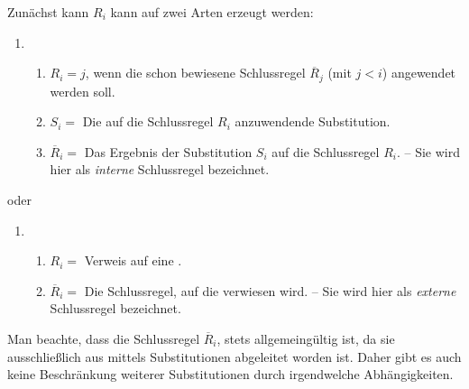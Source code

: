\begin{enumerate}
	Zunächst kann $R_i$ kann auf zwei Arten erzeugt werden:
	\begin{enumerate}
		\item
		\begin{enumerate}
			\item $R_i = j$, wenn die schon bewiesene Schlussregel $\overline{R}_j$ (mit $j < i$) angewendet werden soll.
			\item $S_i =$ Die auf die Schlussregel $R_i$ anzuwendende Substitution.
			\item $\overline{R}_i =$ Das Ergebnis der Substitution $S_i$ auf die Schlussregel $R_i$.
			-- Sie wird hier als \emph{interne} Schlussregel bezeichnet.
		\end{enumerate}
		\setcounter{Enumii}{\value{enumii}}%
	\end{enumerate}
	oder
	\begin{enumerate}
		\setcounter{enumii}{\value{Enumii}}%
		\item
		\begin{enumerate}
			\item $R_i =$ Verweis auf eine .
			\item $\overline{R}_i =$ Die Schlussregel, auf die verwiesen wird.
			-- Sie wird hier als \emph{externe} Schlussregel bezeichnet.
		\end{enumerate}
		\setcounter{Enumii}{\value{enumii}}%
	\end{enumerate}
	Man beachte, dass die Schlussregel $\overline{R}_i$, stets allgemeingültig ist, da sie ausschließlich aus  mittels Substitutionen abgeleitet worden ist.
	Daher gibt es auch keine Beschränkung weiterer Substitutionen durch irgendwelche Abhängigkeiten.
	

\end{enumerate}
